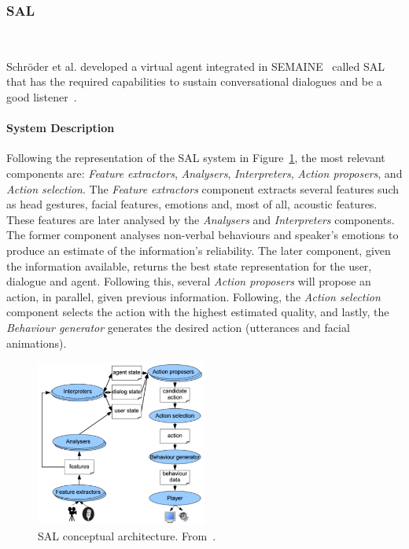 \subsubsection{\acl{SAL}} \hspace*{\fill} \\
\label{subsec:AutonomousSensitiveArtificialListeners}

Schröder et al. developed a virtual agent integrated in SEMAINE~\cite{Schroder2010} called \ac{SAL} that has the required capabilities to sustain conversational dialogues and be a good listener~\cite{Schroder2012}.

\paragraph{\textbf{System Description}}

Following the representation of the \ac{SAL} system in Figure~\ref{fig:sensitiveAgent}, the most relevant components are: \textit{Feature extractors}, \textit{Analysers}, \textit{Interpreters}, \textit{Action proposers}, and \textit{Action selection}. The \textit{Feature extractors} component extracts several features such as head gestures, facial features, emotions and, most of all, acoustic features. These features are later analysed by the \textit{Analysers} and \textit{Interpreters} components. The former component analyses non-verbal behaviours and speaker's emotions to produce an estimate of the information's reliability. The later component, given the information available, returns the best state representation for the user, dialogue and agent. Following this, several \textit{Action proposers} will propose an action, in parallel, given previous information. Following, the \textit{Action selection} component selects the action with the highest estimated quality, and lastly, the \textit{Behaviour generator} generates the desired action (utterances and facial animations).

\vspace{-3mm}
\begin{figure}
	\centering
	\includegraphics[width=0.5\textwidth]{images/SensitiveAgent.png}
	\caption{\acl{SAL} conceptual architecture. From~\cite{Schroder2012}.}
	\label{fig:sensitiveAgent}
\end{figure}
\vspace{-7mm}

